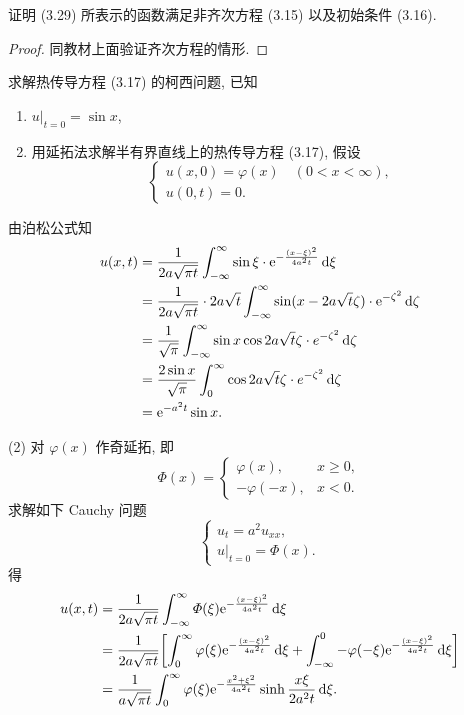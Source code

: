 \begin{exercise}[4]
  证明 (3.29) 所表示的函数满足非齐次方程 (3.15) 以及初始条件 (3.16).
\end{exercise}

\begin{proof}
  同教材上面验证齐次方程的情形.
\end{proof}


\begin{exercise}[5]
  求解热传导方程 (3.17) 的柯西问题, 已知
  \begin{enumerate}[(1)]
    \item $u|_{t=0} = \sin x$,
    \item 用延拓法求解半有界直线上的热传导方程 (3.17), 假设
      \[\begin{cases}
        u(x,0) = \varphi(x)\quad (0<x<\infty), \\
        u(0,t) = 0.
      \end{cases}\]
  \end{enumerate}
\end{exercise}

\begin{solution}
  由泊松公式知
  \[\begin{split}
    u(x,t)
    & = \frac{1}{2a\sqrt{\pi t}} \int_{-\infty}^{\infty}
        \sin\xi\cdot \mathrm{e}^{-\frac{(x-\xi)^2}{4a^2t}}\mathop{}\!\mathrm{d}\xi \\
    & = \frac{1}{2a\sqrt{\pi t}}\cdot 2a\sqrt{t}\int_{-\infty}^{\infty}
        \sin(x-2a\sqrt{t}\zeta)\cdot \mathrm{e}^{-\zeta^2}\mathop{}\!\mathrm{d}\zeta \\
    & = \frac{1}{\sqrt{\pi}} \int_{-\infty}^{\infty}
        \sin x\cos 2a\sqrt{t}\zeta\cdot e^{-\zeta^2}\mathop{}\!\mathrm{d}\zeta \\
    & = \frac{2\sin x}{\sqrt{\pi}} \int_0^{\infty}
        \cos 2a\sqrt{t}\zeta\cdot e^{-\zeta^2}\mathop{}\!\mathrm{d}\zeta \\
    & = \mathrm{e}^{-a^2t}\sin x.
  \end{split}\]

  (2) 对 $\varphi(x)$ 作奇延拓, 即
  \[\varPhi(x) = \begin{cases}
    \varphi(x),   & x\geq 0, \\
    -\varphi(-x), & x<0.
  \end{cases}\]
  求解如下 Cauchy 问题
  \[\begin{cases}
    u_t = a^2 u_{xx}, \\
    u|_{t=0} = \varPhi(x).
  \end{cases}\]
  得
  \begin{align*}
    u(x,t)
    & = \frac{1}{2a\sqrt{\pi t}} \int_{-\infty}^{\infty}
        \varPhi(\xi) \mathrm{e}^{-\frac{(x-\xi)^2}{4a^2t}} \mathop{}\!\mathrm{d}\xi \\
    & = \frac{1}{2a\sqrt{\pi t}} \biggl[
        \int_0^{\infty} \varphi(\xi) \mathrm{e}^{-\frac{(x-\xi)^2}{4a^2t}} \mathop{}\!\mathrm{d}\xi
        + \int_{-\infty}^0 -\varphi(-\xi) \mathrm{e}^{-\frac{(x-\xi)^2}{4a^2t}}\mathop{}\!\mathrm{d}\xi\biggr] \\
    & = \frac{1}{a\sqrt{\pi t}} \int_0^{\infty} \varphi(\xi)
        \mathrm{e}^{-\frac{x^2+\xi^2}{4a^2 t}}\sinh \frac{x\xi}{2a^2 t}\mathop{}\!\mathrm{d}\xi. \qedhere
  \end{align*}
\end{solution}


